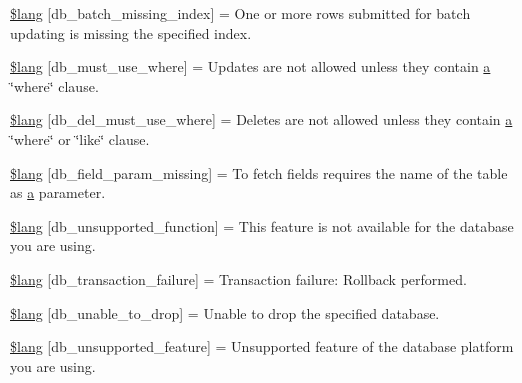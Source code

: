 \begin{DoxyCompactItemize}
\item 
\mbox{\hyperlink{db__lang_8php_acacf1b64d64a429a217318dc759be621}{\$lang}} \mbox{[}\textquotesingle{}db\+\_\+batch\+\_\+missing\+\_\+index\textquotesingle{}\mbox{]} = \textquotesingle{}One or more rows submitted for batch updating is missing the specified index.\textquotesingle{}
\item 
\mbox{\hyperlink{db__lang_8php_a2a744fb7156ec6fa5e103c1af04b4db2}{\$lang}} \mbox{[}\textquotesingle{}db\+\_\+must\+\_\+use\+\_\+where\textquotesingle{}\mbox{]} = \textquotesingle{}Updates are not allowed unless they contain \mbox{\hyperlink{interfacea}{a}} \char`\"{}where\char`\"{} clause.\textquotesingle{}
\item 
\mbox{\hyperlink{db__lang_8php_a9dae040ef4bd563b5ed5df288c98d356}{\$lang}} \mbox{[}\textquotesingle{}db\+\_\+del\+\_\+must\+\_\+use\+\_\+where\textquotesingle{}\mbox{]} = \textquotesingle{}Deletes are not allowed unless they contain \mbox{\hyperlink{interfacea}{a}} \char`\"{}where\char`\"{} or \char`\"{}like\char`\"{} clause.\textquotesingle{}
\item 
\mbox{\hyperlink{db__lang_8php_a80033cf90bcb8c6b9db4593fd6e2c810}{\$lang}} \mbox{[}\textquotesingle{}db\+\_\+field\+\_\+param\+\_\+missing\textquotesingle{}\mbox{]} = \textquotesingle{}To fetch fields requires the name of the table as \mbox{\hyperlink{interfacea}{a}} parameter.\textquotesingle{}
\item 
\mbox{\hyperlink{db__lang_8php_aed09746af6105cd39f2cc6ffaa96740a}{\$lang}} \mbox{[}\textquotesingle{}db\+\_\+unsupported\+\_\+function\textquotesingle{}\mbox{]} = \textquotesingle{}This feature is not available for the database you are using.\textquotesingle{}
\item 
\mbox{\hyperlink{db__lang_8php_ad6164b67b0187b403166c652a8503ace}{\$lang}} \mbox{[}\textquotesingle{}db\+\_\+transaction\+\_\+failure\textquotesingle{}\mbox{]} = \textquotesingle{}Transaction failure\+: Rollback performed.\textquotesingle{}
\item 
\mbox{\hyperlink{db__lang_8php_a1c70abccf684437ff6e0d83e1ca1b791}{\$lang}} \mbox{[}\textquotesingle{}db\+\_\+unable\+\_\+to\+\_\+drop\textquotesingle{}\mbox{]} = \textquotesingle{}Unable to drop the specified database.\textquotesingle{}
\item 
\mbox{\hyperlink{db__lang_8php_a21ca7e58bb09c70a6cb55a8c285ff3e4}{\$lang}} \mbox{[}\textquotesingle{}db\+\_\+unsupported\+\_\+feature\textquotesingle{}\mbox{]} = \textquotesingle{}Unsupported feature of the database platform you are using.\textquotesingle{}

\end{DoxyCompactItemize}
